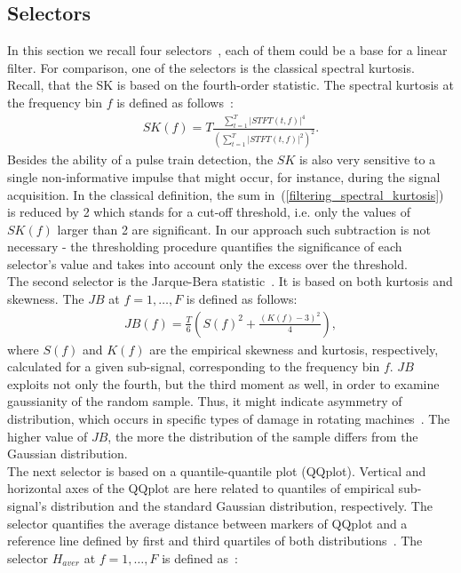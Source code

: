 \subsection{Selectors}\label{filtering_selectors}
In this section we recall four selectors~\cite{Obuchowski2014138,Obuchowski2013441}, each of them could be a base for a linear filter. For comparison, one of the selectors is the classical spectral kurtosis. Recall, that the SK is based on the fourth-order statistic. The spectral kurtosis at the frequency bin $f$ is defined as follows~\cite{Antoni2006308}:
\begin{eqnarray}
SK(f)=T\frac{\sum_{t=1}^{T}|STFT(t,f)|^4}{(\sum_{t=1}^{T}|STFT(t,f)|^2)^2}.\label{filtering_spectral_kurtosis}
\end{eqnarray}
Besides the ability of a pulse train detection, the $SK$ is also very sensitive to a single non-informative impulse that might occur, for instance, during the signal acquisition. In the classical definition, the sum in~(\ref{filtering_spectral_kurtosis}) is reduced by 2 which stands for a cut-off threshold, i.e. only the values of $SK(f)$ larger than 2 are significant. In our approach such subtraction is not necessary - the thresholding procedure quantifies the significance of each selector's value and takes into account only the excess over the threshold.\\
The second selector is the Jarque-Bera statistic~\cite{Jarque1980255,Burnecki2012}. It is based on both kurtosis and skewness. The $JB$ at $f=1,\ldots,F$ is defined as follows:
\begin{eqnarray}
JB(f)=\frac{T}{6}\left(S(f)^2+\frac{\left(K(f)-3\right)^2}{4}\right),
\end{eqnarray}
where $S(f)$ and $K(f)$ are the empirical skewness and kurtosis, respectively, calculated for a given sub-signal, corresponding to the frequency bin $f$. $JB$ exploits not only the fourth, but the third moment as well, in order to examine gaussianity of the random sample. Thus, it might indicate asymmetry of distribution, which occurs in specific types of damage in rotating machines~\cite{Ovacikli2013462}. The higher value of $JB$, the more the distribution of the sample differs from the Gaussian distribution.\\
The next selector is based on a quantile-quantile plot (QQplot). Vertical and horizontal axes of the QQplot are here related to quantiles of empirical sub-signal's distribution and the standard Gaussian distribution, respectively. The selector quantifies the average distance between markers of QQplot and a reference line defined by first and third quartiles of both distributions~\cite{Obuchowski2013441}. The selector $H_{aver}$ at $f=1,\ldots,F$ is defined as~\cite{Obuchowski2014138}:
